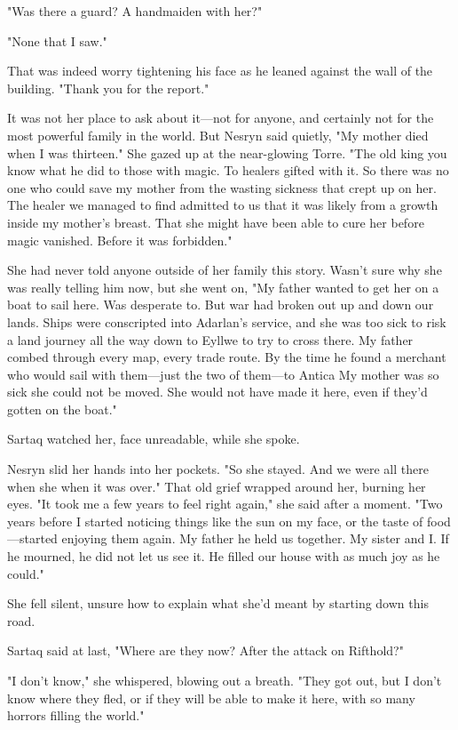 "Was there a guard? A handmaiden with her?"

"None that I saw."

That was indeed worry tightening his face as he leaned against the wall of the building. "Thank you for the report."

It was not her place to ask about it---not for anyone, and certainly not for the most powerful family in the world. But Nesryn said quietly, "My mother died when I was thirteen." She gazed up at the near-glowing Torre. "The old king  you know what he did to those with magic. To healers gifted with it. So there was no one who could save my mother from the wasting sickness that crept up on her. The healer we managed to find admitted to us that it was likely from a growth inside my mother's breast. That she might have been able to cure her before magic vanished. Before it was forbidden."

She had never told anyone outside of her family this story. Wasn't sure why she was really telling him now, but she went on, "My father wanted to get her on a boat to sail here. Was desperate to. But war had broken out up and down our lands. Ships were conscripted into Adarlan's service, and she was too sick to risk a land journey all the way down to Eyllwe to try to cross there. My father combed through every map, every trade route. By the time he found a merchant who would sail with them---just the two of them---to Antica  My mother was so sick she could not be moved. She would not have made it here, even if they'd gotten on the boat."

Sartaq watched her, face unreadable, while she spoke.

Nesryn slid her hands into her pockets. "So she stayed. And we were all there when she  when it was over." That old grief wrapped around her, burning her eyes. "It took me a few years to feel right again," she said after a moment. "Two years before I started noticing things like the sun on my face, or the taste of food ---started enjoying them again. My father  he held us together. My sister and I. If he mourned, he did not let us see it. He filled our house with as much joy as he could."

She fell silent, unsure how to explain what she'd meant by starting down this road.

Sartaq said at last, "Where are they now? After the attack on Rifthold?"

"I don't know," she whispered, blowing out a breath. "They got out, but  I don't know where they fled, or if they will be able to make it here, with so many horrors filling the world."

